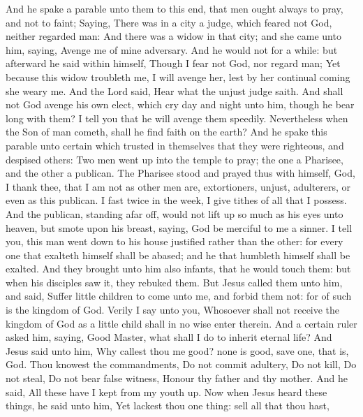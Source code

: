  And he spake a parable unto them to this end, that men
ought always to pray, and not to faint;  Saying, There was
in a city a judge, which feared not God, neither regarded man:
 And there was a widow in that city; and she came unto him,
saying, Avenge me of mine adversary.  And he would not for a
while: but afterward he said within himself, Though I fear not God, nor
regard man;  Yet because this widow troubleth me, I will
avenge her, lest by her continual coming she weary me.  And
the Lord said, Hear what the unjust judge saith.  And shall
not God avenge his own elect, which cry day and night unto him, though
he bear long with them?  I tell you that he will avenge them
speedily. Nevertheless when the Son of man cometh, shall he find faith
on the earth?  And he spake this parable unto certain which
trusted in themselves that they were righteous, and despised others:
 Two men went up into the temple to pray; the one a
Pharisee, and the other a publican.  The Pharisee stood and
prayed thus with himself, God, I thank thee, that I am not as other men
are, extortioners, unjust, adulterers, or even as this publican.
 I fast twice in the week, I give tithes of all that I
possess.  And the publican, standing afar off, would not
lift up so much as his eyes unto heaven, but smote upon his breast,
saying, God be merciful to me a sinner.  I tell you, this
man went down to his house justified rather than the other: for every
one that exalteth himself shall be abased; and he that humbleth himself
shall be exalted.  And they brought unto him also infants,
that he would touch them: but when his disciples saw it, they rebuked
them.  But Jesus called them unto him, and said, Suffer
little children to come unto me, and forbid them not: for of such is the
kingdom of God.  Verily I say unto you, Whosoever shall not
receive the kingdom of God as a little child shall in no wise enter
therein.  And a certain ruler asked him, saying, Good
Master, what shall I do to inherit eternal life?  And Jesus
said unto him, Why callest thou me good? none is good, save one, that
is, God.  Thou knowest the commandments, Do not commit
adultery, Do not kill, Do not steal, Do not bear false witness, Honour
thy father and thy mother.  And he said, All these have I
kept from my youth up.  Now when Jesus heard these things,
he said unto him, Yet lackest thou one thing: sell all that thou hast,
